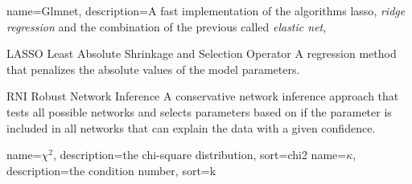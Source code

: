 %
%
\usepackage[toc,acronym,style=long]{glossaries} %
\makeglossaries
\newcommand{\g}{\footnote{For all abbreviations see the glossary on page \pageref{nom}.}} %

\usepackage{xparse} %
 {
}




{
  name=Glmnet,
  description={A fast implementation of the algorithms \gls{lasso}, \emph{ridge regression} and the combination of the previous called \emph{elastic net}},
}

{LASSO}
{Least Absolute Shrinkage and Selection Operator}
{A regression method that penalizes the absolute values of the model parameters.\cite{Tibshirani1996}}

{RNI}
{Robust Network Inference}
{A conservative network inference approach that tests all possible networks and selects parameters based on if the parameter is included in all networks that can explain the data with a given confidence.\cite{Nordling2013phdthesis}}

{
  name={\ensuremath{\chi^2}},
  description={the chi-square distribution},
  sort=chi2
}
{
  name={\ensuremath{\kappa}},
  description={the condition number},
  sort=k
}
